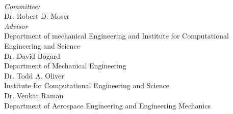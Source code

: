 \begin{titlepage}
\begin{minipage}{0.4\textwidth}
\begin{flushleft} \large
{}%
\end{flushleft}
\end{minipage}
~
\begin{minipage}{0.4\textwidth}
\begin{flushright} \large
\emph{Committee:} \\
 \vspace{5mm}
{\Large Dr. Robert D. Moser} \\
{\normalsize \textsl{Advisor}} \\
{\normalsize Department of mechanical Engineering and Institute for Computational Engineering and Science} \\
 \vspace{5mm}
{\Large Dr. David Bogard} \\
{\normalsize Department of Mechanical Engineering} \\
 \vspace{5mm}
{\Large Dr. Todd A. Oliver} \\
{\normalsize Institute for Computational Engineering and Science} \\
 \vspace{5mm}
{\Large Dr. Venkat Raman} \\
{\normalsize Department of Aerospace Engineering and Engineering Mechanics} \\
\end{flushright}
\end{minipage}\\[4cm]




 

\vfill %

\end{titlepage}
%
